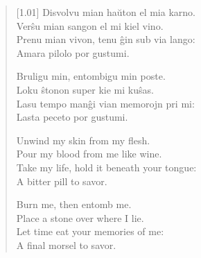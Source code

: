 \begin{verse}[1.01\textwidth]
    Disvolvu mian haŭton el mia karno.\\
    Verŝu mian sangon el mi kiel vino.\\
    Prenu mian vivon, tenu ĝin sub via lango:\\
    \vin Amara pilolo por gustumi.

    Bruligu min, entombigu min poste.\\
    Loku ŝtonon super kie mi kuŝas.\\
    Lasu tempo manĝi vian memorojn pri mi:\\
    \vin Lasta peceto por gustumi.

    \secdiv

    Unwind my skin from my flesh.\\
    Pour my blood from me like wine.\\
    Take my life, hold it beneath your tongue:\\
    \vin A bitter pill to savor.

    Burn me, then entomb me.\\
    Place a stone over where I lie.\\
    Let time eat your memories of me:\\
    \vin A final morsel to savor.
\end{verse}
